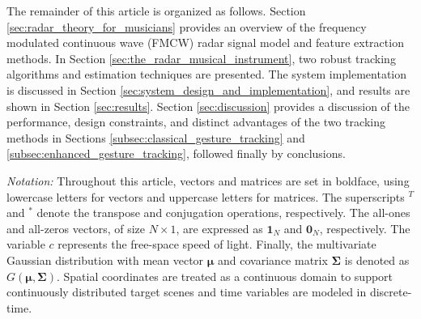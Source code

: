 \documentclass[10pt,journal,final]{IEEEtran}
\begin{document}
The remainder of this article is organized as follows. 
Section \ref{sec:radar_theory_for_musicians} provides an overview of the frequency modulated continuous wave (FMCW) radar signal model and feature extraction methods. 
In Section \ref{sec:the_radar_musical_instrument}, two robust tracking algorithms and estimation techniques are presented.
The system implementation is discussed in Section \ref{sec:system_design_and_implementation}, and results are shown in Section \ref{sec:results}. 
Section \ref{sec:discussion} provides a discussion of the performance, design constraints, and distinct advantages of the two tracking methods in Sections \ref{subsec:classical_gesture_tracking} and \ref{subsec:enhanced_gesture_tracking}, followed finally by conclusions.

\textit{Notation:} Throughout this article, vectors and matrices are set in boldface, using lowercase letters for vectors and uppercase letters for matrices. 
The superscripts $^T$ and $^*$ denote the transpose and conjugation operations, respectively. 
The all-ones and all-zeros vectors, of size $N \times 1$, are expressed as $\mathbf{1}_N$ and $\mathbf{0}_N$, respectively. 
The variable $c$ represents the free-space speed of light.
Finally, the multivariate Gaussian distribution with mean vector $\mathbf{\mu}$ and covariance matrix $\mathbf{\Sigma}$ is denoted as $G(\mathbf{\mu},\mathbf{\Sigma})$.
Spatial coordinates are treated as a continuous domain to support continuously distributed target scenes and time variables are modeled in discrete-time.

\end{document}
